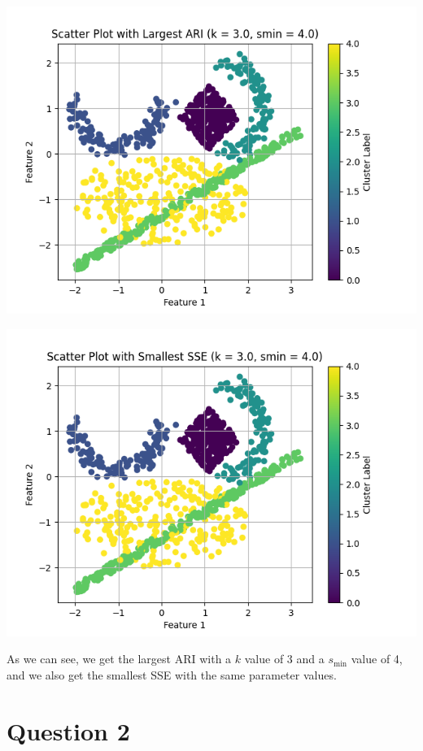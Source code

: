 \documentclass{article}
\begin{document}
\noindent
\begin{minipage}{.5\textwidth}
  \centering
  \includegraphics[width=0.9\linewidth]{Jarvis_ARI.png}
\end{minipage}%
\begin{minipage}{.5\textwidth}
  \centering
  \includegraphics[width=0.9\linewidth]{Jarvis_SSE.png}
\end{minipage}


As we can see, we get the largest ARI with a $k$ value of 3 and a $s_{\text{min}}$ value of 4, and we also get the smallest SSE with the same parameter values.

\section*{Question 2}
\end{document}
